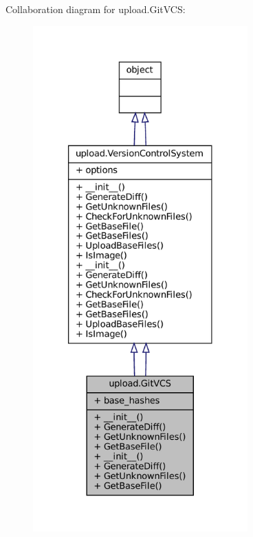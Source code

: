 Collaboration diagram for upload.\+Git\+V\+CS\+:
\nopagebreak
\begin{figure}[H]
\begin{center}
\leavevmode
\includegraphics[height=550pt]{classupload_1_1GitVCS__coll__graph}
\end{center}
\end{figure}
